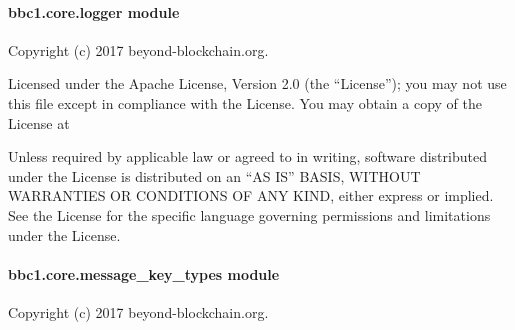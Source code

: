 \documentclass[letterpaper,10pt,english]{sphinxmanual}
\begin{document}
\begin{fulllineitems}
\label{\detokenize{bbc1.core.key_exchange_manager:bbc1.core.key_exchange_manager.remove_old_key}}
\end{fulllineitems}



\paragraph{bbc1.core.logger module}
\label{\detokenize{bbc1.core.logger:module-bbc1.core.logger}}\label{\detokenize{bbc1.core.logger:bbc1-core-logger-module}}\label{\detokenize{bbc1.core.logger::doc}}
Copyright (c) 2017 beyond-blockchain.org.

Licensed under the Apache License, Version 2.0 (the “License”);
you may not use this file except in compliance with the License.
You may obtain a copy of the License at
\begin{quote}

\end{quote}

Unless required by applicable law or agreed to in writing, software
distributed under the License is distributed on an “AS IS” BASIS,
WITHOUT WARRANTIES OR CONDITIONS OF ANY KIND, either express or implied.
See the License for the specific language governing permissions and
limitations under the License.

\begin{fulllineitems}
\label{\detokenize{bbc1.core.logger:bbc1.core.logger.get_logger}}
\end{fulllineitems}



\paragraph{bbc1.core.message\_key\_types module}
\label{\detokenize{bbc1.core.message_key_types:bbc1-core-message-key-types-module}}\label{\detokenize{bbc1.core.message_key_types::doc}}\label{\detokenize{bbc1.core.message_key_types:module-bbc1.core.message_key_types}}
Copyright (c) 2017 beyond-blockchain.org.
\end{document}
